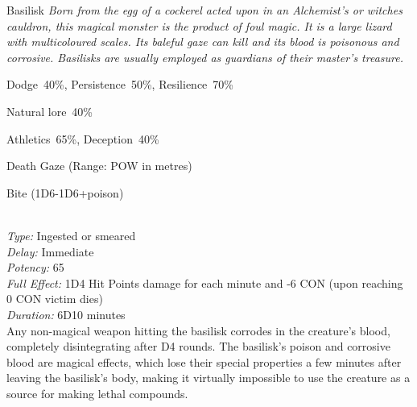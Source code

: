 \begin{monsterbox}{Basilisk}
	\textit{Born from the egg of a cockerel acted upon in an Alchemist’s or witches cauldron, this magical monster is the product of foul magic. It is a large lizard with multicoloured scales. Its baleful gaze can kill and its blood is poisonous and corrosive. Basilisks are usually employed as guardians of their master’s treasure.}\\
	\rpghline
	\basics[%
        hitpoints  = 8, %
	majorwound = 4,
	damagemodifier = -1D6,
	powerpoints = 16,
	movementrate = 15m,
	armor = Armor Scales (2AP),
	plunderrating = 5
	]
	\rpghline%
	\stats[ %
		STR = 2D3   (4),
		CON = 2D6+6 (13),
		DEX = 3D6   (11),
		SIZ = 1D3   (2),
		INT = 3     (3),
		POW = 1D6+12 (16),
		CHA = 3     (3)
	]
	\rpghline%
	\begin{rpg-monsteraction}[Resistances]
		Dodge~40\%, Persistence~50\%, Resilience~70\%
	\end{rpg-monsteraction}
	\begin{rpg-monsteraction}[Knowledge]
    		Natural lore~40\%
	\end{rpg-monsteraction}
	\begin{rpg-monsteraction}[Practical]
		Athletics~65\%, Deception~40\%
	\end{rpg-monsteraction}
	\begin{rpg-monsteraction}
		Death Gaze (Range: POW in metres)
	\end{rpg-monsteraction}
	\begin{rpg-monsteraction}
		Bite (1D6-1D6+poison)
	\end{rpg-monsteraction}
	\begin{rpg-monsteraction}\\
		\textit{Type:} Ingested or smeared\\
		\textit{Delay:} Immediate\\
		\textit{Potency:} 65\\
		\textit{Full Effect:} 1D4 Hit Points damage for each minute and -6 CON (upon reaching 0 CON victim dies)\\ 
		\textit{Duration:} 6D10 minutes\\
		Any non-magical weapon hitting the basilisk corrodes in the creature’s blood, completely disintegrating after D4 rounds. The basilisk’s poison and corrosive blood are magical effects, which lose their special properties a few minutes after leaving the basilisk’s body, making it virtually impossible to use the creature as a source for making lethal compounds.

\end{rpg-monsteraction}
\end{monsterbox}

